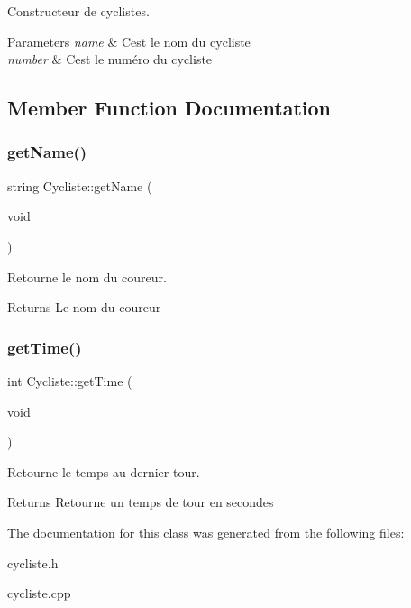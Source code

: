 Constructeur de cyclistes. 


\begin{DoxyParams}{Parameters}
{\em name} & C\textquotesingle{}est le nom du cycliste \\
\hline
{\em number} & C\textquotesingle{}est le numéro du cycliste \\
\hline
\end{DoxyParams}


\subsection{Member Function Documentation}
\mbox{\label{classCycliste_a0c46061d327f2c76830904fb83a370a5}} 
\subsubsection{\texorpdfstring{get\+Name()}{getName()}}
{\footnotesize\ttfamily string Cycliste\+::get\+Name (\begin{DoxyParamCaption}\item[{void}]{ }\end{DoxyParamCaption})}



Retourne le nom du coureur. 

\begin{DoxyReturn}{Returns}
Le nom du coureur 
\end{DoxyReturn}
\mbox{\label{classCycliste_a9cef69b7cb1050fea25da277eea06940}} 
\subsubsection{\texorpdfstring{get\+Time()}{getTime()}}
{\footnotesize\ttfamily int Cycliste\+::get\+Time (\begin{DoxyParamCaption}\item[{void}]{ }\end{DoxyParamCaption})}



Retourne le temps au dernier tour. 

\begin{DoxyReturn}{Returns}
Retourne un temps de tour en secondes 
\end{DoxyReturn}


The documentation for this class was generated from the following files\+:\begin{DoxyCompactItemize}
\item 
cycliste.\+h\item 
cycliste.\+cpp\end{DoxyCompactItemize}

